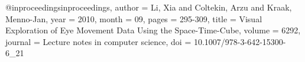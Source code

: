 @inproceedings{inproceedings,
author = {Li, Xia and Coltekin, Arzu and Kraak, Menno-Jan},
year = {2010},
month = {09},
pages = {295-309},
title = {Visual Exploration of Eye Movement Data Using the Space-Time-Cube},
volume = {6292},
journal = {Lecture notes in computer science},
doi = {10.1007/978-3-642-15300-6_21}
}